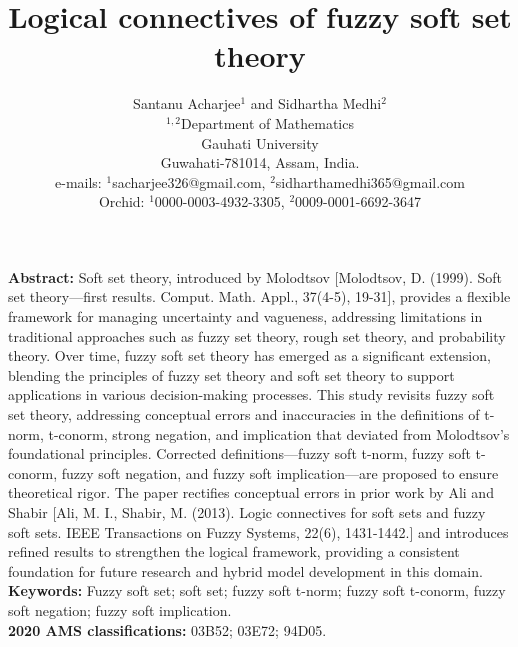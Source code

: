 \documentclass{article}
\title{Logical connectives of fuzzy soft set theory}
\date{}
\theoremstyle{definition}
\begin{document}
\author{Santanu Acharjee$^1$ and Sidhartha Medhi$^2$\\
$^{1,2}$Department of Mathematics\\
Gauhati University\\
Guwahati-781014, Assam, India.\\
e-mails: $^1$sacharjee326@gmail.com,
$^2$sidharthamedhi365@gmail.com\\
Orchid: $^1$0000-0003-4932-3305,
$^2$0009-0001-6692-3647}

\maketitle
{\bf Abstract:} 
Soft set theory, introduced by Molodtsov [Molodtsov, D. (1999). Soft set theory—first results. Comput. Math. Appl., 37(4-5), 19-31], provides a flexible framework for managing uncertainty and vagueness, addressing limitations in traditional approaches such as fuzzy set theory, rough set theory, and probability theory. Over time, fuzzy soft set theory has emerged as a significant extension, blending the principles of fuzzy set theory and soft set theory to support applications in various decision-making processes. This study revisits fuzzy soft set theory, addressing conceptual errors and inaccuracies in the definitions of t-norm, t-conorm, strong negation, and implication that deviated from Molodtsov's foundational principles. Corrected definitions—fuzzy soft t-norm, fuzzy soft t-conorm, fuzzy soft  negation, and  fuzzy soft implication—are proposed to ensure theoretical rigor. The paper rectifies conceptual errors in prior work by Ali and Shabir [Ali, M. I.,  Shabir, M. (2013). Logic connectives for soft sets and fuzzy soft sets. IEEE Transactions on Fuzzy Systems, 22(6), 1431-1442.] and introduces refined results to strengthen the logical framework, providing a consistent foundation for future research and hybrid model development in this domain.\\

{\bf Keywords: } Fuzzy soft set; soft set; fuzzy soft t-norm; fuzzy soft t-conorm, fuzzy soft negation; fuzzy soft implication.\\

{\bf 2020 AMS classifications: } 03B52; 03E72;  94D05.\\
\end{document}
